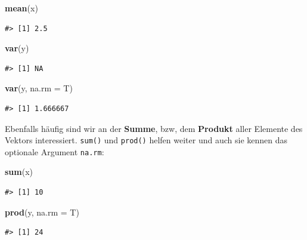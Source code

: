 \documentclass[]{tufte-book}
\newenvironment{Shaded}{}{}
\newcommand{\KeywordTok}[1]{\textcolor[rgb]{0.00,0.44,0.13}{\textbf{#1}}}
\newcommand{\DataTypeTok}[1]{\textcolor[rgb]{0.56,0.13,0.00}{#1}}
\newcommand{\NormalTok}[1]{#1}
\begin{document}
\begin{Shaded}
\begin{Highlighting}[]
\KeywordTok{mean}\NormalTok{(x)}
\end{Highlighting}
\end{Shaded}

\begin{verbatim}
#> [1] 2.5
\end{verbatim}

\begin{Shaded}
\begin{Highlighting}[]
\KeywordTok{var}\NormalTok{(y)}
\end{Highlighting}
\end{Shaded}

\begin{verbatim}
#> [1] NA
\end{verbatim}

\begin{Shaded}
\begin{Highlighting}[]
\KeywordTok{var}\NormalTok{(y, }\DataTypeTok{na.rm =}\NormalTok{ T)}
\end{Highlighting}
\end{Shaded}

\begin{verbatim}
#> [1] 1.666667
\end{verbatim}

Ebenfalls häufig sind wir an der \textbf{Summe}, bzw, dem
\textbf{Produkt} aller Elemente des Vektors interessiert. \texttt{sum()}
und \texttt{prod()} helfen weiter und auch sie kennen das optionale
Argument \texttt{na.rm}:

\begin{Shaded}
\begin{Highlighting}[]
\KeywordTok{sum}\NormalTok{(x)}
\end{Highlighting}
\end{Shaded}

\begin{verbatim}
#> [1] 10
\end{verbatim}

\begin{Shaded}
\begin{Highlighting}[]
\KeywordTok{prod}\NormalTok{(y, }\DataTypeTok{na.rm =}\NormalTok{ T)}
\end{Highlighting}
\end{Shaded}

\begin{verbatim}
#> [1] 24
\end{verbatim}
\end{document}

